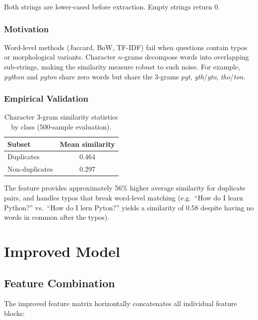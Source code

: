 \documentclass[11pt,a4paper]{article}
\begin{document}
Both strings are lower-cased before extraction. Empty strings return 0.

\subsubsection{Motivation}

Word-level methods (Jaccard, BoW, TF-IDF) fail when questions contain typos or morphological variants. Character $n$-grams decompose words into overlapping sub-strings, making the similarity measure robust to such noise. For example, \emph{python} and \emph{pyton} share zero words but share the 3-grams \emph{pyt}, \emph{yth}/\emph{yto}, \emph{tho}/\emph{ton}.

\subsubsection{Empirical Validation}

\begin{table}[h]
\centering
\caption{Character 3-gram similarity statistics by class (500-sample evaluation).}
\begin{tabular}{lc}
\toprule
\textbf{Subset} & \textbf{Mean similarity} \\
\midrule
Duplicates     & 0.464 \\
Non-duplicates & 0.297 \\
\bottomrule
\end{tabular}
\end{table}

The feature provides approximately 56\% higher average similarity for duplicate pairs, and handles typos that break word-level matching (e.g.\ ``How do I learn Python?'' vs.\ ``How do I lern Pyton?'' yields a similarity of 0.58 despite having no words in common after the typos).

\section{Improved Model}
\label{sec:improved}

\subsection{Feature Combination}

The improved feature matrix horizontally concatenates all individual feature blocks:
\end{document}
